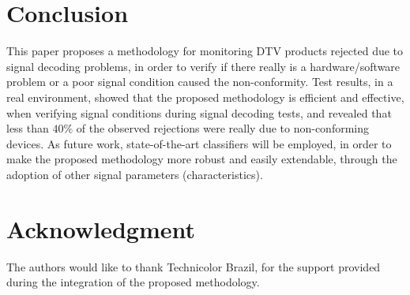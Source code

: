 \documentclass[conference]{IEEEtran}
\begin{document}




\section{Conclusion}
This paper proposes a methodology for monitoring DTV products rejected due to signal decoding problems, in order to verify if there really is a hardware/software problem or a poor signal condition caused the non-conformity. Test results, in a real environment, showed that the proposed methodology is efficient and effective, when verifying signal conditions during signal decoding tests, and revealed that less than $40\%$ of the observed rejections were really due to non-conforming devices. As future work, state-of-the-art classifiers will be employed, in order to make the proposed methodology more robust and easily extendable, through the adoption of other signal parameters (characteristics).






\section*{Acknowledgment}

The authors would like to thank Technicolor Brazil, for the support provided during the integration of the proposed methodology.






\end{document}

